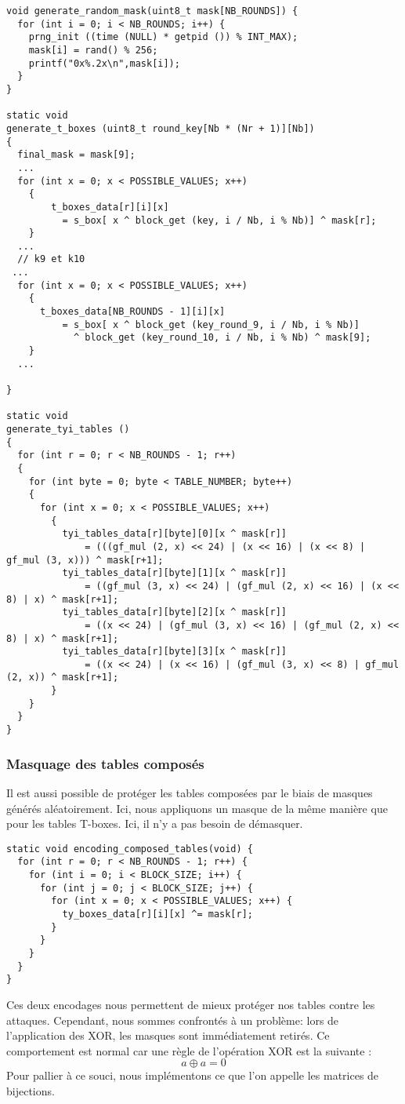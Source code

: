 \documentclass[a4paper, 10pt]{article}
\begin{document}
\scriptsize{
\begin{verbatim}
void generate_random_mask(uint8_t mask[NB_ROUNDS]) {
  for (int i = 0; i < NB_ROUNDS; i++) {
    prng_init ((time (NULL) * getpid ()) % INT_MAX);
    mask[i] = rand() % 256; 
    printf("0x%.2x\n",mask[i]);
  }
}

static void
generate_t_boxes (uint8_t round_key[Nb * (Nr + 1)][Nb])
{
  final_mask = mask[9];
  ...
  for (int x = 0; x < POSSIBLE_VALUES; x++)
    {
        t_boxes_data[r][i][x]
          = s_box[ x ^ block_get (key, i / Nb, i % Nb)] ^ mask[r];
    }
  ...   
  // k9 et k10
 ...
  for (int x = 0; x < POSSIBLE_VALUES; x++)
    {
      t_boxes_data[NB_ROUNDS - 1][i][x]
          = s_box[ x ^ block_get (key_round_9, i / Nb, i % Nb)]
            ^ block_get (key_round_10, i / Nb, i % Nb) ^ mask[9];
    }
  ...

}

static void
generate_tyi_tables ()
{
  for (int r = 0; r < NB_ROUNDS - 1; r++) 
  {
    for (int byte = 0; byte < TABLE_NUMBER; byte++)
    {
      for (int x = 0; x < POSSIBLE_VALUES; x++)
        {
          tyi_tables_data[r][byte][0][x ^ mask[r]]
              = (((gf_mul (2, x) << 24) | (x << 16) | (x << 8) | gf_mul (3, x))) ^ mask[r+1];
          tyi_tables_data[r][byte][1][x ^ mask[r]]
              = ((gf_mul (3, x) << 24) | (gf_mul (2, x) << 16) | (x << 8) | x) ^ mask[r+1];
          tyi_tables_data[r][byte][2][x ^ mask[r]]
              = ((x << 24) | (gf_mul (3, x) << 16) | (gf_mul (2, x) << 8) | x) ^ mask[r+1];
          tyi_tables_data[r][byte][3][x ^ mask[r]]
              = ((x << 24) | (x << 16) | (gf_mul (3, x) << 8) | gf_mul (2, x)) ^ mask[r+1];
        }
    }
  }
}
\end{verbatim}
}
\normalsize
\subsubsection{Masquage des tables composés}
Il est aussi possible de protéger les tables composées par le biais de masques générés aléatoirement.
Ici, nous appliquons un masque de la même manière que pour les tables T-boxes. Ici, il n'y a pas besoin de 
démasquer.
\small{
  \begin{verbatim}
static void encoding_composed_tables(void) {
  for (int r = 0; r < NB_ROUNDS - 1; r++) {
    for (int i = 0; i < BLOCK_SIZE; i++) {
      for (int j = 0; j < BLOCK_SIZE; j++) {
        for (int x = 0; x < POSSIBLE_VALUES; x++) {
          ty_boxes_data[r][i][x] ^= mask[r];
        }
      }
    }
  }
}
  \end{verbatim}
}
\normalsize
Ces deux encodages nous permettent de mieux protéger nos tables contre les attaques. Cependant, nous sommes 
confrontés à un problème: lors de l'application des XOR, les masques sont immédiatement retirés. Ce comportement est
normal car une règle de l'opération XOR est la suivante :
\[ a \oplus a = 0\]
Pour pallier à ce souci, nous implémentons ce que l'on appelle les matrices de bijections.
\end{document}
